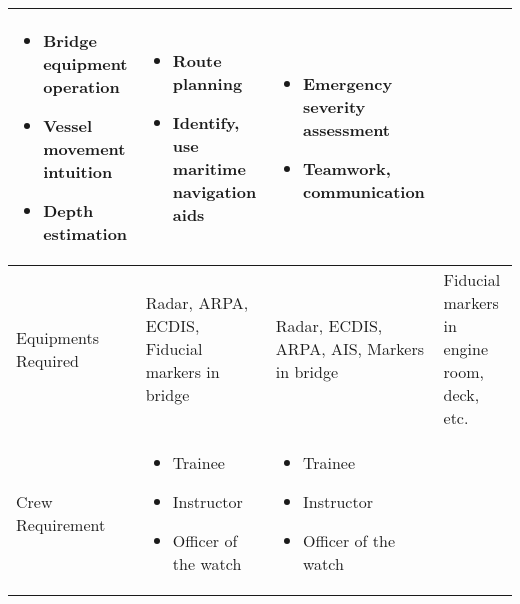 \begin{table}
\begin{tabular}{@{}p{2.2cm}|p{3.3cm}|p{3.2cm}|p{3.3cm}|@{}}
\begin{itemize}[leftmargin=*,topsep=0pt,align=left,itemsep=0.25pt,after=]
			\item Bridge equipment operation
			\item Vessel movement intuition
			\item Depth estimation  
		\end{itemize}
		& \vspace{-2mm}\begin{itemize}[leftmargin=*,topsep=0pt,align=left,itemsep=0.25pt,after=]
			\renewcommand{\labelitemi}{\scalebox{.9}{\tiny\listsymb}} 
			\item Route planning
			\item Identify, use maritime navigation aids
		\end{itemize}
		& \vspace{-2mm}\begin{itemize}[leftmargin=*,topsep=0pt,align=left,itemsep=0.25pt,after=]
			\renewcommand{\labelitemi}{\scalebox{.9}{\tiny\listsymb}}
			\item Emergency severity assessment 
			\item Teamwork, communication 
		\end{itemize}  \\
		\hline
		Equipments Required & Radar, ARPA, ECDIS, Fiducial markers in bridge & Radar, ECDIS, ARPA, AIS, Markers in bridge & Fiducial markers in engine room, deck, etc. \\
		\hline
		Crew Requirement & 
		\vspace{-2mm} \begin{itemize}[leftmargin=*,topsep=0pt,align=left,itemsep=0.25pt,after=]
			\renewcommand{\labelitemi}{\scalebox{.9}{\tiny\listsymb}}
			\item Trainee 
			\item Instructor
			\item Officer of the watch
		\end{itemize}
		&\vspace{-2mm} \begin{itemize}[leftmargin=*,topsep=0pt,align=left,itemsep=0.25pt,after=]
			\renewcommand{\labelitemi}{\scalebox{.9}{\tiny\listsymb}}
			\item Trainee 
			\item Instructor
			\item Officer of the watch
		\end{itemize}
		& \vspace{-2mm} \begin{itemize}[leftmargin=*,topsep=0pt,align=left,itemsep=0.25pt,after=]
			\renewcommand{\labelitemi}{\scalebox{.9}{\tiny\listsymb}}

\end{itemize}
\end{tabular}
\end{table}
